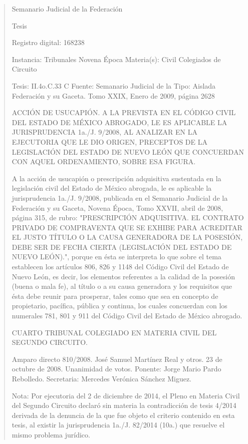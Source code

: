 \documentclass[11pt,a4paper]{article}
\begin{document}
\begin{quote}
                                                   Semanario Judicial de la Federación

                                                  Tesis

 Registro digital: 168238

 Instancia: Tribunales            Novena Época                         Materia(s): Civil
 Colegiados de Circuito

 Tesis: II.4o.C.33 C              Fuente: Semanario Judicial de la Tipo: Aislada
                                  Federación y su Gaceta.
                                  Tomo XXIX, Enero de 2009, página
                                  2628


ACCIÓN DE USUCAPIÓN. A LA PREVISTA EN EL CÓDIGO CIVIL DEL ESTADO DE MÉXICO
ABROGADO, LE ES APLICABLE LA JURISPRUDENCIA 1a./J. 9/2008, AL ANALIZAR EN LA
EJECUTORIA QUE LE DIO ORIGEN, PRECEPTOS DE LA LEGISLACIÓN DEL ESTADO DE
NUEVO LEÓN QUE CONCUERDAN CON AQUEL ORDENAMIENTO, SOBRE ESA FIGURA.


A la acción de usucapión o prescripción adquisitiva sustentada en la legislación civil del Estado de
México abrogada, le es aplicable la jurisprudencia 1a./J. 9/2008, publicada en el Semanario Judicial
de la Federación y su Gaceta, Novena Época, Tomo XXVII, abril de 2008, página 315, de rubro:
"PRESCRIPCIÓN ADQUISITIVA. EL CONTRATO PRIVADO DE COMPRAVENTA QUE SE
EXHIBE PARA ACREDITAR EL JUSTO TÍTULO O LA CAUSA GENERADORA DE LA POSESIÓN,
DEBE SER DE FECHA CIERTA (LEGISLACIÓN DEL ESTADO DE NUEVO LEÓN).", porque en
ésta se interpreta lo que sobre el tema establecen los artículos 806, 826 y 1148 del Código Civil del
Estado de Nuevo León, es decir, los elementos referentes a la calidad de la posesión (buena o mala
fe), al título o a su causa generadora y los requisitos que ésta debe reunir para prosperar, tales
como que sea en concepto de propietario, pacífica, pública y continua, los cuales concuerdan con
los numerales 781, 801 y 911 del Código Civil del Estado de México abrogado.

CUARTO TRIBUNAL COLEGIADO EN MATERIA CIVIL DEL SEGUNDO CIRCUITO.


Amparo directo 810/2008. José Samuel Martínez Real y otros. 23 de octubre de 2008. Unanimidad
de votos. Ponente: Jorge Mario Pardo Rebolledo. Secretaria: Mercedes Verónica Sánchez Miguez.

Nota: Por ejecutoria del 2 de diciembre de 2014, el Pleno en Materia Civil del Segundo Circuito
declaró sin materia la contradicción de tesis 4/2014 derivada de la denuncia de la que fue objeto el
criterio contenido en esta tesis, al existir la jurisprudencia 1a./J. 82/2014 (10a.) que resuelve el
mismo problema jurídico.





\end{quote}
\end{document}
